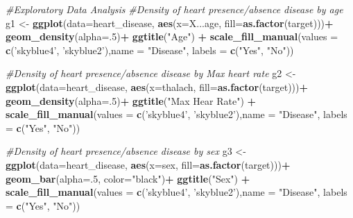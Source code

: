 \documentclass[]{article}
\newenvironment{Shaded}{\begin{snugshade}}{\end{snugshade}}
\newcommand{\KeywordTok}[1]{\textcolor[rgb]{0.13,0.29,0.53}{\textbf{#1}}}
\newcommand{\DataTypeTok}[1]{\textcolor[rgb]{0.13,0.29,0.53}{#1}}
\newcommand{\DecValTok}[1]{\textcolor[rgb]{0.00,0.00,0.81}{#1}}
\newcommand{\StringTok}[1]{\textcolor[rgb]{0.31,0.60,0.02}{#1}}
\newcommand{\CommentTok}[1]{\textcolor[rgb]{0.56,0.35,0.01}{\textit{#1}}}
\newcommand{\OperatorTok}[1]{\textcolor[rgb]{0.81,0.36,0.00}{\textbf{#1}}}
\newcommand{\NormalTok}[1]{#1}
\begin{document}
\begin{Shaded}
\begin{Highlighting}[]
\CommentTok{#Exploratory Data Analysis}
\CommentTok{#Density of heart presence/absence disease by age}
\NormalTok{g1 <-}\StringTok{ }\KeywordTok{ggplot}\NormalTok{(}\DataTypeTok{data=}\NormalTok{heart_disease, }\KeywordTok{aes}\NormalTok{(}\DataTypeTok{x=}\NormalTok{X...age, }\DataTypeTok{fill=}\KeywordTok{as.factor}\NormalTok{(target)))}\OperatorTok{+}
\StringTok{  }\KeywordTok{geom_density}\NormalTok{(}\DataTypeTok{alpha=}\NormalTok{.}\DecValTok{5}\NormalTok{)}\OperatorTok{+}
\StringTok{  }\KeywordTok{ggtitle}\NormalTok{(}\StringTok{"Age"}\NormalTok{) }\OperatorTok{+}
\StringTok{  }\KeywordTok{scale_fill_manual}\NormalTok{(}\DataTypeTok{values =} \KeywordTok{c}\NormalTok{(}\StringTok{'skyblue4'}\NormalTok{, }\StringTok{'skyblue2'}\NormalTok{),}\DataTypeTok{name =} \StringTok{"Disease"}\NormalTok{, }\DataTypeTok{labels =} \KeywordTok{c}\NormalTok{(}\StringTok{"Yes"}\NormalTok{, }\StringTok{"No"}\NormalTok{))}

\CommentTok{#Density of heart presence/absence disease by Max heart rate}
\NormalTok{g2 <-}\StringTok{ }\KeywordTok{ggplot}\NormalTok{(}\DataTypeTok{data=}\NormalTok{heart_disease, }\KeywordTok{aes}\NormalTok{(}\DataTypeTok{x=}\NormalTok{thalach, }\DataTypeTok{fill=}\KeywordTok{as.factor}\NormalTok{(target)))}\OperatorTok{+}
\StringTok{  }\KeywordTok{geom_density}\NormalTok{(}\DataTypeTok{alpha=}\NormalTok{.}\DecValTok{5}\NormalTok{)}\OperatorTok{+}
\StringTok{  }\KeywordTok{ggtitle}\NormalTok{(}\StringTok{"Max Hear Rate"}\NormalTok{) }\OperatorTok{+}
\StringTok{  }\KeywordTok{scale_fill_manual}\NormalTok{(}\DataTypeTok{values =} \KeywordTok{c}\NormalTok{(}\StringTok{'skyblue4'}\NormalTok{, }\StringTok{'skyblue2'}\NormalTok{),}\DataTypeTok{name =} \StringTok{"Disease"}\NormalTok{, }\DataTypeTok{labels =} \KeywordTok{c}\NormalTok{(}\StringTok{"Yes"}\NormalTok{, }\StringTok{"No"}\NormalTok{))}

\CommentTok{#Density of heart presence/absence disease by sex}
\NormalTok{g3 <-}\StringTok{ }\KeywordTok{ggplot}\NormalTok{(}\DataTypeTok{data=}\NormalTok{heart_disease, }\KeywordTok{aes}\NormalTok{(}\DataTypeTok{x=}\NormalTok{sex, }\DataTypeTok{fill=}\KeywordTok{as.factor}\NormalTok{(target)))}\OperatorTok{+}
\StringTok{      }\KeywordTok{geom_bar}\NormalTok{(}\DataTypeTok{alpha=}\NormalTok{.}\DecValTok{5}\NormalTok{, }\DataTypeTok{color=}\StringTok{"black"}\NormalTok{)}\OperatorTok{+}
\StringTok{      }\KeywordTok{ggtitle}\NormalTok{(}\StringTok{"Sex"}\NormalTok{) }\OperatorTok{+}
\StringTok{      }\KeywordTok{scale_fill_manual}\NormalTok{(}\DataTypeTok{values =} \KeywordTok{c}\NormalTok{(}\StringTok{'skyblue4'}\NormalTok{, }\StringTok{'skyblue2'}\NormalTok{),}\DataTypeTok{name =} \StringTok{"Disease"}\NormalTok{, }\DataTypeTok{labels =} \KeywordTok{c}\NormalTok{(}\StringTok{"Yes"}\NormalTok{, }\StringTok{"No"}\NormalTok{))}


\end{Highlighting}
\end{Shaded}
\end{document}
